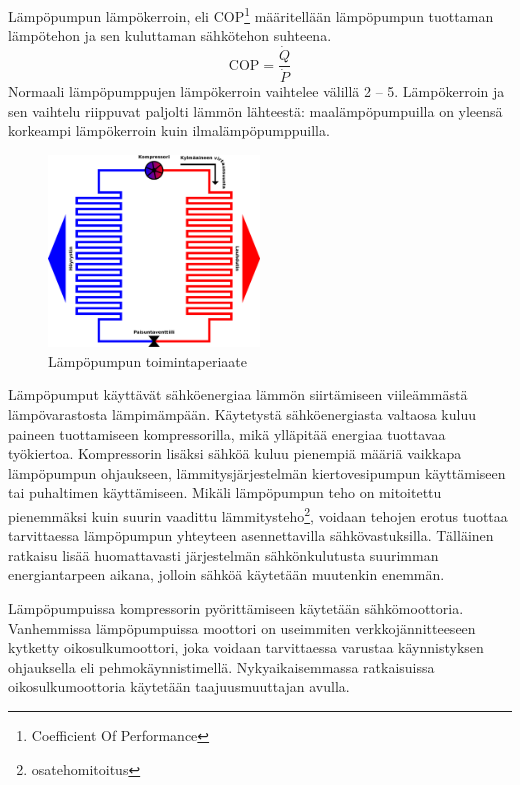   Lämpöpumpun lämpökerroin, eli COP\footnote{Coefficient Of Performance} määritellään lämpöpumpun tuottaman lämpötehon ja sen kuluttaman sähkötehon suhteena.
  \begin{displaymath}
      \textrm{COP} = \frac{\dot{Q}}{\dot{P}}
  \end{displaymath}
  Normaali lämpöpumppujen lämpökerroin vaihtelee välillä 2 -- 5. Lämpökerroin ja sen vaihtelu riippuvat paljolti lämmön lähteestä: maalämpöpumpuilla on yleensä korkeampi lämpökerroin kuin ilmalämpöpumppuilla.\parencite{DincerRosen}

  \begin{figure}
    \centering
    \includegraphics[width=0.5\textwidth]{figures/hp}
    \caption{Lämpöpumpun toimintaperiaate}
    \label{fig:hptp}
  \end{figure}

  Lämpöpumput käyttävät sähköenergiaa lämmön siirtämiseen viileämmästä lämpövarastosta lämpimämpään. Käytetystä sähköenergiasta valtaosa kuluu paineen tuottamiseen kompressorilla, mikä ylläpitää energiaa tuottavaa työkiertoa. Kompressorin lisäksi sähköä kuluu pienempiä määriä vaikkapa lämpöpumpun ohjaukseen, lämmitysjärjestelmän kiertovesipumpun käyttämiseen tai puhaltimen käyttämiseen. Mikäli lämpöpumpun teho on mitoitettu pienemmäksi kuin suurin vaadittu lämmitysteho\footnote{osatehomitoitus}, voidaan tehojen erotus tuottaa tarvittaessa lämpöpumpun yhteyteen asennettavilla sähkövastuksilla. Tälläinen ratkaisu lisää huomattavasti järjestelmän sähkönkulutusta suurimman energiantarpeen aikana, jolloin sähköä käytetään muutenkin enemmän.

  Lämpöpumpuissa kompressorin pyörittämiseen käytetään sähkömoottoria. Vanhemmissa lämpöpumpuissa moottori on useimmiten verkkojännitteeseen kytketty oikosulkumoottori, joka voidaan tarvittaessa varustaa käynnistyksen ohjauksella eli pehmokäynnistimellä. Nykyaikaisemmassa ratkaisuissa oikosulkumoottoria käytetään taajuusmuuttajan avulla.

